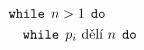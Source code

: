 \documentclass[preview]{standalone}
\begin{document}
\begin{align*}
\mathtt{while}& \:\: n > 1 \:\: \mathtt{do}\\&\hspace*{-16pt}\mathtt{while} \:\: p_i \text{ dělí } n \:\: \mathtt{do}
\end{align*}
\end{document}
